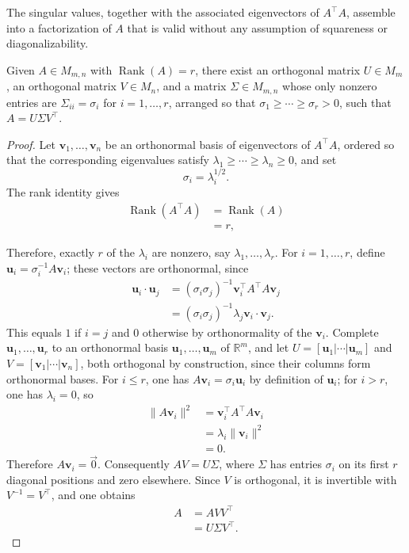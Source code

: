 The singular values, together with the associated eigenvectors of $A^{\top}A$, assemble into a factorization of $A$ that is valid without any assumption of squareness or diagonalizability.

\begin{theorem}
Given $A \in M_{m,n}$ with $\operatorname{Rank}(A) = r$, there exist an orthogonal matrix $U \in M_m$, an orthogonal matrix $V \in M_n$, and a matrix $\Sigma \in M_{m,n}$ whose only nonzero entries are $\Sigma_{ii} = \sigma_i$ for $i = 1, \dots, r$, arranged so that $\sigma_1 \geq \cdots \geq \sigma_r > 0$, such that $A = U \Sigma V^{\top}$.
\end{theorem}

\begin{proof}
Let $\mathbf{v}_1, \dots, \mathbf{v}_n$ be an orthonormal basis of eigenvectors of $A^{\top}A$, ordered so that the corresponding eigenvalues satisfy $\lambda_1 \geq \cdots \geq \lambda_n \geq 0$, and set
\[
\sigma_i = \lambda_i^{1/2}.
\]
The rank identity gives
\[
\begin{aligned}
\operatorname{Rank}(A^{\top}A) &= \operatorname{Rank}(A) \\
&= r,
\end{aligned}
\]

Therefore, exactly $r$ of the $\lambda_i$ are nonzero, say $\lambda_1, \dots, \lambda_r$. For $i = 1, \dots, r$, define $\mathbf{u}_i = \sigma_i^{-1} A \mathbf{v}_i$; these vectors are orthonormal, since
\[
\begin{aligned}
\mathbf{u}_i \cdot \mathbf{u}_j &= (\sigma_i \sigma_j)^{-1} \mathbf{v}_i^{\top} A^{\top} A \mathbf{v}_j \\
&= (\sigma_i \sigma_j)^{-1} \lambda_j \mathbf{v}_i \cdot \mathbf{v}_j.
\end{aligned}
\]
This equals $1$ if $i=j$ and $0$ otherwise by orthonormality of the $\mathbf{v}_i$. Complete $\mathbf{u}_1, \dots, \mathbf{u}_r$ to an orthonormal basis $\mathbf{u}_1, \dots, \mathbf{u}_m$ of $\mathbb{R}^m$, and let $U = [\mathbf{u}_1 | \cdots | \mathbf{u}_m]$ and $V = [\mathbf{v}_1 | \cdots | \mathbf{v}_n]$, both orthogonal by construction, since their columns form orthonormal bases. For $i \leq r$, one has $A\mathbf{v}_i = \sigma_i \mathbf{u}_i$ by definition of $\mathbf{u}_i$; for $i > r$, one has $\lambda_i = 0$, so
\[
\begin{aligned}
\|A\mathbf{v}_i\|^2 &= \mathbf{v}_i^{\top}A^{\top}A\mathbf{v}_i \\
&= \lambda_i \|\mathbf{v}_i\|^2 \\
&= 0.
\end{aligned}
\]
Therefore $A\mathbf{v}_i = \vec{0}$. Consequently $AV = U\Sigma$, where $\Sigma$ has entries $\sigma_i$ on its first $r$ diagonal positions and zero elsewhere. Since $V$ is orthogonal, it is invertible with $V^{-1} = V^{\top}$, and one obtains
\[
\begin{aligned}
A &= AVV^{\top} \\
&= U\Sigma V^{\top}.
\end{aligned}
\]

\end{proof}

